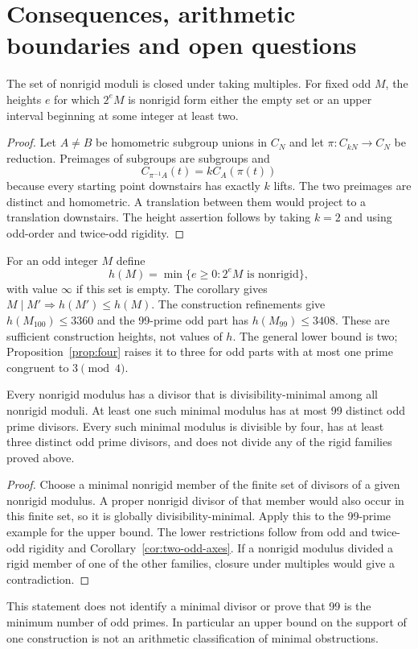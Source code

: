 \section{Consequences, arithmetic boundaries and open questions}\label{v2:sec:consequences}

\begin{corollary}\label{vi:cor:lift}
The set of nonrigid moduli is closed under taking multiples. For fixed odd $M$, the heights $e$ for which $2^eM$ is nonrigid form either the empty set or an upper interval beginning at some integer at least two.
\end{corollary}
\begin{proof}
Let $A\ne B$ be homometric subgroup unions in $C_N$ and let $\pi:C_{kN}\to C_N$ be reduction. Preimages of subgroups are subgroups and
\[
 C_{\pi^{-1}A}(t)=kC_A(\pi(t))
\]
because every starting point downstairs has exactly $k$ lifts. The two preimages are distinct and homometric. A translation between them would project to a translation downstairs. The height assertion follows by taking $k=2$ and using odd-order and twice-odd rigidity.
\end{proof}

For an odd integer $M$ define
\[
 h(M)=\min\{e\ge0:2^eM\text{ is nonrigid}\},
\]
with value $\infty$ if this set is empty. The corollary gives $M\mid M'\Rightarrow h(M')\le h(M)$. The construction refinements give $h(M_{100})\le3360$ and the 99-prime odd part has $h(M_{99})\le3408$. These are sufficient construction heights, not values of $h$. The general lower bound is two; Proposition~\ref{prop:four} raises it to three for odd parts with at most one prime congruent to $3\pmod4$.

\begin{corollary}\label{v2:cor:minimal}
Every nonrigid modulus has a divisor that is divisibility-minimal among all nonrigid moduli. At least one such minimal modulus has at most 99 distinct odd prime divisors. Every such minimal modulus is divisible by four, has at least three distinct odd prime divisors, and does not divide any of the rigid families proved above.
\end{corollary}
\begin{proof}
Choose a minimal nonrigid member of the finite set of divisors of a given nonrigid modulus. A proper nonrigid divisor of that member would also occur in this finite set, so it is globally divisibility-minimal. Apply this to the 99-prime example for the upper bound. The lower restrictions follow from odd and twice-odd rigidity and Corollary~\ref{cor:two-odd-axes}. If a nonrigid modulus divided a rigid member of one of the other families, closure under multiples would give a contradiction.
\end{proof}
This statement does not identify a minimal divisor or prove that 99 is the minimum number of odd primes. In particular an upper bound on the support of one construction is not an arithmetic classification of minimal obstructions.

